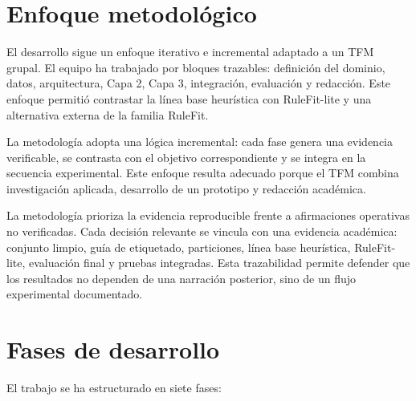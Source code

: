 \section{Enfoque metodológico}

El desarrollo sigue un enfoque iterativo e incremental adaptado a un TFM grupal. El
equipo ha trabajado por bloques trazables: definición del dominio, datos, arquitectura,
Capa 2, Capa 3, integración, evaluación y redacción. Este enfoque permitió
contrastar la línea base heurística con RuleFit-lite y una alternativa externa de la familia RuleFit.

La metodología adopta una lógica incremental: cada fase genera una evidencia verificable, se contrasta con el objetivo correspondiente y se integra en la secuencia experimental. Este enfoque resulta adecuado porque el TFM combina investigación aplicada, desarrollo de un prototipo y redacción académica.

La metodología prioriza la evidencia reproducible frente a afirmaciones operativas no verificadas. Cada decisión relevante se vincula con una evidencia académica: conjunto limpio, guía de etiquetado, particiones, línea base heurística, RuleFit-lite, evaluación final y pruebas integradas. Esta trazabilidad permite defender que los resultados no dependen de una narración posterior, sino de un flujo experimental documentado.

\section{Fases de desarrollo}

El trabajo se ha estructurado en siete fases:


